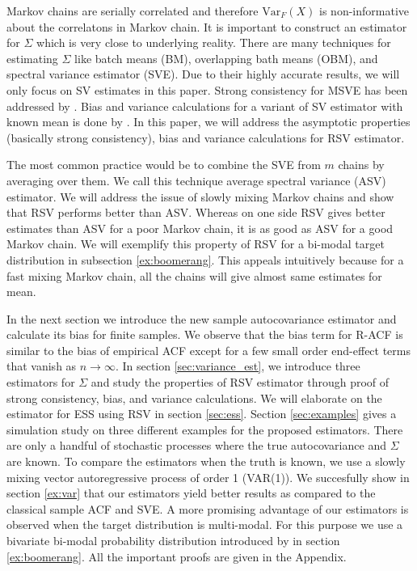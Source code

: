 \documentclass[12pt]{article}
\newcommand{\Var}{\text{Var}}
\theoremstyle{remark}
\begin{document}
Markov chains are serially correlated and therefore $\Var_F(X)$ is non-informative about the correlatons in Markov chain. It is important to construct an estimator for $\Sigma$ which is very close to underlying reality. There are many techniques for estimating $\Sigma$ like batch means (BM), overlapping bath means (OBM), and spectral variance estimator (SVE). Due to their highly accurate results, we will only focus on SV estimates in this paper. Strong consistency for MSVE has been addressed by \cite{vats:fleg:jon:2018}. Bias and variance calculations for a variant of SV estimator with known mean is done by \cite{hannan2009multiple}. In this paper, we will address the asymptotic properties (basically strong consistency), bias and variance calculations for RSV estimator. 

The most common practice would be to combine the SVE from $m$ chains by averaging over them. We call this technique average spectral variance (ASV) estimator. We will address the issue of slowly mixing Markov chains and show that RSV performs better than ASV. Whereas on one side RSV gives better estimates than ASV for a poor Markov chain, it is as good as ASV for a good Markov chain. We will exemplify this property of RSV for a bi-modal target distribution in subsection \ref{ex:boomerang}. This appeals intuitively because for a fast mixing Markov chain, all the chains will give almost same estimates for mean. 

In the next section we introduce the new sample autocovariance estimator and calculate its bias for finite samples. We observe that the bias term for R-ACF is similar to the bias of empirical ACF except for a few small order end-effect terms that vanish as $n \to \infty$. In section \ref{sec:variance_est}, we introduce three estimators for $\Sigma$ and study the properties of RSV estimator through proof of strong consistency, bias, and variance calculations. We will elaborate on the estimator for ESS using RSV in section \ref{sec:ess}. Section \ref{sec:examples} gives a simulation study on three different examples for the proposed estimators. There are only a handful of stochastic processes where the true autocovariance and $\Sigma$ are known. To compare the estimators when the truth is known, we use a slowly mixing vector autoregressive process of order 1 (VAR(1)). We succesfully show in section \ref{ex:var} that our estimators yield better results as compared to the classical sample ACF and SVE. A more promising advantage of our estimators is observed when the target distribution is multi-modal. For this purpose we use a bivariate bi-modal probability distribution introduced by \cite{gelman1991note} in section \ref{ex:boomerang}. All the important proofs are given in the Appendix. 
\end{document}
